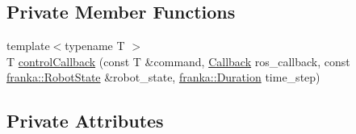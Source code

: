 \subsection*{Private Member Functions}
\begin{DoxyCompactItemize}
\item 
{\footnotesize template$<$typename T $>$ }\\T \hyperlink{classfranka__hw_1_1FrankaHW_a4014fbce5bae60ee693505775ecee499}{control\+Callback} (const T \&command, \hyperlink{classfranka__hw_1_1FrankaHW_ac576bd5140a03864888c68519daa5aa4}{Callback} ros\+\_\+callback, const \hyperlink{structfranka_1_1RobotState}{franka\+::\+Robot\+State} \&robot\+\_\+state, \hyperlink{classfranka_1_1Duration}{franka\+::\+Duration} time\+\_\+step)
\end{DoxyCompactItemize}
\subsection*{Private Attributes}
